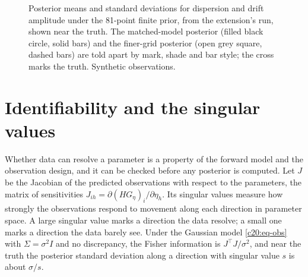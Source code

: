 \begin{figure}[ht]
\centering
{}
\caption{Posterior means and standard deviations for dispersion and drift amplitude under the
81-point finite prior, from the extension's run, shown near the truth. The matched-model posterior (filled black circle, solid bars) and the finer-grid posterior (open grey square, dashed
bars) are told apart by mark, shade and bar style; the cross marks the truth. Synthetic observations.}
\label{c20:fig-post}
\end{figure}

\section{Identifiability and the singular values}

Whether data can resolve a parameter is a property of the forward model and the observation design, and it can be checked before any posterior is computed. Let $J$ be the Jacobian of the predicted observations with respect to the parameters, the matrix of sensitivities
$J_{ih}=\partial(HG_\eta)_i/\partial\eta_h$. Its singular values measure how strongly the observations respond to
movement along each direction in parameter space. A large singular value marks a direction the data resolve; a small one marks a direction the data barely see. Under the Gaussian
model \eqref{c20:eq-obs} with $\Sigma=\sigma^2I$ and no discrepancy, the Fisher information is $J^\top J/\sigma^2$, and near
the truth the posterior standard deviation along a direction with singular value $s$ is about
$\sigma/s$.

